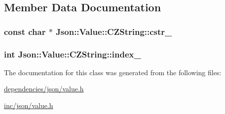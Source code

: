 \subsection{Member Data Documentation}
\hypertarget{classJson_1_1Value_1_1CZString_a16da56821a29e3a4cbe2d71b4f8d6995}{
\subsubsection[{cstr\-\_\-}]{\setlength{\rightskip}{0pt plus 5cm}const char $\ast$ Json\-::\-Value\-::\-C\-Z\-String\-::cstr\-\_\-\hspace{0.3cm}{\ttfamily [private]}}}\label{de/d6e/classJson_1_1Value_1_1CZString_a16da56821a29e3a4cbe2d71b4f8d6995}
\hypertarget{classJson_1_1Value_1_1CZString_aa061d02bc98d883524a99f4c2279fd89}{
\subsubsection[{index\-\_\-}]{\setlength{\rightskip}{0pt plus 5cm}int Json\-::\-Value\-::\-C\-Z\-String\-::index\-\_\-\hspace{0.3cm}{\ttfamily [private]}}}\label{de/d6e/classJson_1_1Value_1_1CZString_aa061d02bc98d883524a99f4c2279fd89}


The documentation for this class was generated from the following files\-:\begin{DoxyCompactItemize}
\item 
\hyperlink{dependencies_2json_2value_8h}{dependencies/json/value.\-h}\item 
\hyperlink{inc_2json_2value_8h}{inc/json/value.\-h}\end{DoxyCompactItemize}
